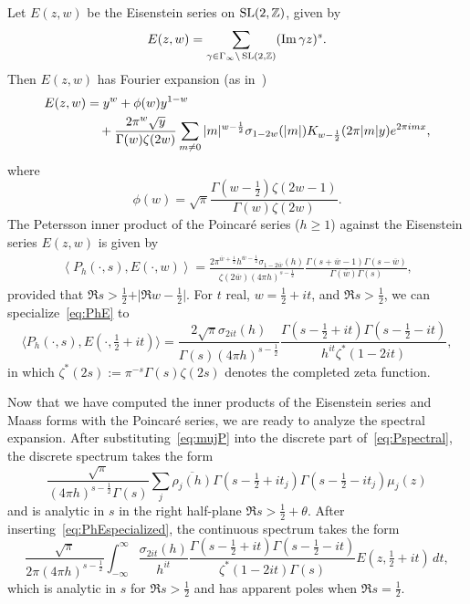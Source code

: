 Let $E(z,w)$ be the Eisenstein series on $\operatorname{SL}(2, \mathbb{Z})$, given by
\begin{equation}
  E(z,w) = \sum_{\gamma \in \Gamma_\infty \backslash \operatorname{SL}(2, \mathbb{Z})} (\operatorname{Im} \gamma z)^s.
\end{equation}
Then $E(z,w)$ has Fourier expansion (as in~\cite[Chapter 3]{Goldfeld2006automorphic})
\begin{align}\label{eq:sums:E_Fourier}
  E(z,w)& =y^w + \phi(w)y^{1-w}  \\
  &\quad +  \frac{2\pi^w \sqrt{y} }{\Gamma(w)\zeta(2w)}\sum_{m \neq 0} \vert m
  \vert^{w-\frac{1}{2}}\sigma_{1-2w}(\vert m \vert) K_{w-\frac{1}{2}}(2\pi \vert m \vert
  y)e^{2\pi i m x}, \notag
\end{align}
where
\begin{equation}
  \phi(w) = \sqrt{\pi} \frac{\Gamma(w - \tfrac{1}{2})\zeta(2w - 1)}{\Gamma(w)\zeta(2w)}.
\end{equation}
The Petersson inner product of the Poincar\'{e} series ($h \geq 1$) against the Eisenstein
series $E(z,w)$ is given by
\begin{align}\label{eq:PhE}
  \left\langle P_h(\cdot,s),E(\cdot,w)\right\rangle =\frac{2\pi^{\overline{w}+\frac{1}{2}}
  h^{\overline{w}-\frac{1}{2}}\sigma_{1-2\overline{w}}(h)}{\zeta(2\overline{w})(4\pi
  h)^{s-\frac{1}{2}}}\frac{\Gamma(s+\overline{w}-1)\Gamma(s-\overline{w})}{\Gamma(\overline{w})\Gamma(s)},
\end{align}
provided that $\Re s >\frac{1}{2}+\vert \Re w-\frac{1}{2}\vert$.
For $t$ real, $w=\frac{1}{2}+it$, and $\Re s>\frac{1}{2}$, we can
specialize~\eqref{eq:PhE} to
\begin{equation}\label{eq:PhEspecialized}
  \langle P_h(\cdot,s),E(\cdot,\tfrac{1}{2}+it)\rangle=\frac{2\sqrt{\pi}
  \sigma_{2it}(h)}{\Gamma(s)(4\pi
  h)^{s-\frac{1}{2}}}\frac{\Gamma(s-\frac{1}{2}+it)\Gamma(s-\frac{1}{2}-it)}{h^{it}\zeta^*(1-2it)},
\end{equation}
in which $\zeta^*(2s):=\pi^{-s}\Gamma(s)\zeta(2s)$ denotes the completed zeta function.


Now that we have computed the inner products of the Eisenstein series and Maass forms with
the Poincar\'e series, we are ready to analyze the spectral expansion.
After substituting~\eqref{eq:mujP} into the discrete part of~\eqref{eq:Pspectral}, the
discrete spectrum takes the form
\begin{equation}
  \frac{\sqrt{\pi}}{(4\pi h)^{s-\frac{1}{2}}\Gamma(s)}\sum_j \overline{\rho_j(h)}
  \Gamma(s-\tfrac{1}{2}+it_j)\Gamma(s-\tfrac{1}{2}-it_j) \mu_j(z)
\end{equation}
and is analytic in $s$ in the right half-plane $\Re s> \frac{1}{2}+\theta$.
After inserting~\eqref{eq:PhEspecialized}, the continuous spectrum takes the form
\begin{equation}
  \frac{\sqrt{\pi}}{2\pi(4\pi h)^{s-\frac{1}{2}}}\int_{-\infty}^\infty
  \frac{\sigma_{2it}(h)}{h^{it}}\frac{\Gamma(s-\frac{1}{2}+it)
  \Gamma(s-\frac{1}{2}-it)}{\zeta^*(1-2it)\Gamma(s)}E(z,\tfrac{1}{2}+it)\,dt,
\end{equation}
which is analytic in $s$ for $\Re s > \frac{1}{2}$ and has apparent poles when $\Re
s=\frac{1}{2}$.


